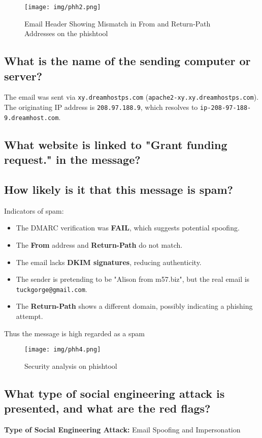 \documentclass{article}
\begin{document}
\begin{figure}[h]
    \centering
    \texttt{[image: img/phh2.png]}
    \caption{Email Header Showing Mismatch in From and Return-Path Addresses on the phishtool}
    \label{fig:email_header}
\end{figure}

\subsection*{What is the name of the sending computer or server?}
The email was sent via \texttt{xy.dreamhostps.com} (\texttt{apache2-xy.xy.dreamhostps.com}).\\
The originating IP address is \texttt{208.97.188.9}, which resolves to \texttt{ip-208-97-188-9.dreamhost.com}.

\subsection*{What website is linked to "Grant funding request." in the message?}

\subsection*{How likely is it that this message is spam?}
Indicators of spam:
\begin{itemize}
    \item The DMARC verification was \textbf{FAIL}, which suggests potential spoofing.
    \item The \textbf{From} address and \textbf{Return-Path} do not match.
    \item The email lacks \textbf{DKIM signatures}, reducing authenticity.
    \item The sender is pretending to be "Alison from m57.biz", but the real email is \texttt{tuckgorge@gmail.com}.
    \item The \textbf{Return-Path} shows a different domain, possibly indicating a phishing attempt.
\end{itemize}
Thus the message is high regarded as a spam

\begin{figure}[h]
    \centering
    \texttt{[image: img/phh4.png]}
    \caption{Security analysis on phishtool}
    \label{fig:phishing_signs}
\end{figure}

\newpage
\subsection*{What type of social engineering attack is presented, and what are the red flags?}
\textbf{Type of Social Engineering Attack:} Email Spoofing and Impersonation
\end{document}
